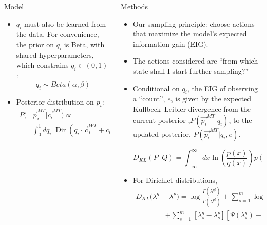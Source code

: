 \documentclass[final]{beamer}
\begin{document}
\begin{frame}{}
\begin{columns}[t]
\begin{column}{.3\linewidth}
\begin{block}{Model}
\begin{itemize}
    \item $q_i$ must also be learned from the data. For convenience, the prior on $q_i$ is Beta, with shared hyperparameters, which constrains $q_i \in (0,1)$:
    $$ q_i \sim Beta(\alpha, \beta) $$
    \item Posterior distribution on $p_i$:
    \begin{align*}
    P(&\vec{p}_i^{MT} \vert \vec{c_i}^{MT}) \propto \\
    &\int_0^1 dq_i \; \operatorname{Dir}(q_i \cdot \vec{c}_i^{WT} + \vec{c_i}^{MT} + 1/2) \cdot  P_{\alpha, \beta}(q_i)
    \end{align*}
    
\end{itemize}
\end{block}
\end{column}

\begin{column}{.3\linewidth}

\begin{block}{Methods}
\begin{itemize}
\item Our sampling principle: choose actions that maximize the model's \alert{expected information gain (EIG)}.

\item The actions considered are ``from which state shall I start further sampling?''

\item Conditional on $q_i$, the EIG of observing a ``count'', $e$, is given by the expected Kullbeck--Leibler divergence from the current posterior ,$P(\vec{p_i}^{MT} | q_i)$, to the updated posterior, $P(\vec{p_i}^{MT} | q_i, e)$.

$$
D_{KL}(P||Q) = \int_{-\infty}^{\infty} dx \ln\left( \frac{p(x)}{q(x)} \right) p(x)
$$

\item For Dirichlet distributions,
\begin{align*}
D_{KL}(\lambda^q &|| \lambda^p) = \log \frac{\Gamma(\lambda^{qt})}{\Gamma(\lambda^{pt})} + \sum_{s=1}^m \log \frac{\Gamma(\lambda^p_s)}{\Gamma(\lambda^q_s)} \\
&+ \sum_{s=1}^m \left[\lambda^q_s -\lambda^p_s\right]\left[\Psi(\lambda^q_s) - \Psi(\lambda^{qt})\right]
\end{align*}



\end{itemize}
\end{block}
\end{column}
\end{columns}
\end{frame}
\end{document}
